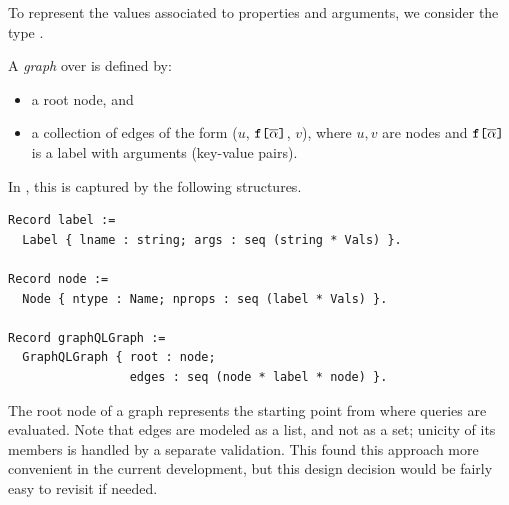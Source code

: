 To represent the values associated to properties and arguments, we consider the type \Vals. 

\begin{definition}
A \emph{\gql graph} over \Vals{} is defined by:
\begin{itemize}
    \item a root node, and
    \item a collection of edges of the form ($u$, $\texttt{f[}\overline{\alpha}\texttt{]}$, $v$), where $u, v$ are nodes and
      $\texttt{f[}\overline{\alpha}\texttt{]}$ is a label with arguments
      (key-value pairs).
\end{itemize}
\end{definition}

In \gcoql, this is captured by the following structures. 
%
\begin{verbatim}
Record label := 
  Label { lname : string; args : seq (string * Vals) }.

Record node := 
  Node { ntype : Name; nprops : seq (label * Vals) }.

Record graphQLGraph := 
  GraphQLGraph { root : node; 
                 edges : seq (node * label * node) }.
\end{verbatim}
The root node of a \gql graph represents the starting point from where queries are evaluated. Note that edges are modeled as a list, and not as a set; unicity of its members is handled by a separate validation. 
This found this approach more convenient in the current development, but this design decision would be fairly easy to revisit if needed.


